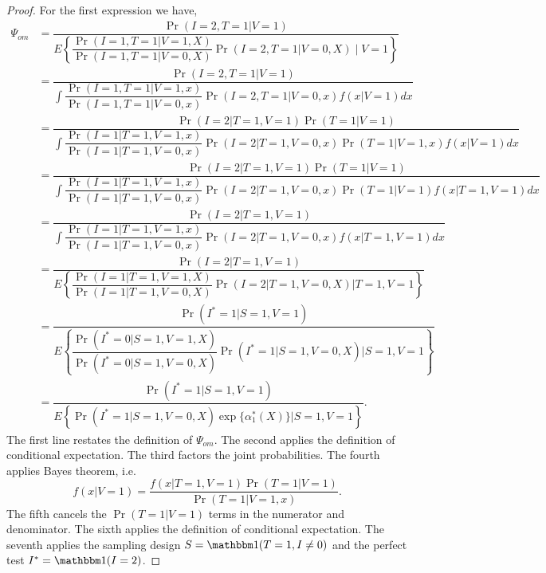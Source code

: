 \begin{appendix}
    \begin{proof}
    For the first expression we have,
        \begin{align*}
        \Psi_{om} &= \dfrac{\Pr(I=2, T = 1|V=1)}{E\left\{ \dfrac{\Pr(I = 1, T = 1 | V = 1, X)}{\Pr(I = 1, T = 1 | V = 0, X)}\Pr(I = 2, T = 1 | V = 0, X) \mid  V = 1\right\}} \\
        &= \dfrac{\Pr(I = 2, T = 1 | V = 1)}{\int \dfrac{\Pr(I = 1, T = 1 | V = 1, x)}{\Pr(I = 1, T = 1 | V = 0, x)} \Pr(I = 2, T = 1 | V = 0, x) f(x | V = 1) dx} \\
        &= \dfrac{\Pr(I = 2 | T = 1, V = 1)\Pr(T = 1 | V = 1)}{\int \dfrac{\Pr(I = 1 | T = 1, V = 1, x)}{\Pr(I = 1 | T = 1, V = 0, x)} \Pr(I = 2 | T = 1, V = 0, x) \Pr(T = 1 | V = 1, x) f(x | V = 1) dx} \\
        &= \dfrac{\Pr(I = 2 | T = 1, V = 1)\Pr(T = 1 | V = 1)}{\int \dfrac{\Pr(I = 1 | T = 1, V = 1, x)}{\Pr(I = 1 | T = 1, V = 0, x)} \Pr(I = 2 | T = 1, V = 0, x) \Pr(T = 1 | V = 1) f(x | T =1, V = 1) dx} \\
        &= \dfrac{\Pr(I = 2 | T = 1, V = 1)}{\int \dfrac{\Pr(I = 1 | T = 1, V = 1, x)}{\Pr(I = 1 | T = 1, V = 0, x)} \Pr(I = 2 | T = 1, V = 0, x) f(x | T =1, V = 1) dx} \\
        &= \dfrac{\Pr(I = 2 | T = 1, V = 1)}{E\left\{ \dfrac{\Pr(I = 1 | T = 1, V = 1, X)}{\Pr(I = 1 | T = 1, V = 0, X)} \Pr(I = 2 | T = 1, V = 0, X) \bigg| T = 1, V = 1\right\}} \\
        &= \dfrac{\Pr(I^* = 1 | S = 1, V = 1)}{E\left\{ \dfrac{\Pr(I^* = 0 | S = 1, V = 1, X)}{\Pr(I^* = 0 | S = 1, V = 0, X)} \Pr(I^* = 1 | S = 1, V = 0, X) \bigg| S = 1, V = 1\right\}} \\
        &= \dfrac{\Pr(I^* = 1 | S = 1, V = 1)}{E\left\{ \Pr(I^* = 1 | S = 1, V = 0, X) \exp\{\alpha^*_1(X)\}\Big| S = 1, V = 1 \right\}}.
    \end{align*}
    The first line restates the definition of $\Psi_{om}$. The second applies the definition of conditional expectation. The third factors the joint probabilities. The fourth applies Bayes theorem, i.e. 
    \begin{equation*}
        f(x | V = 1) = \dfrac{f(x | T = 1, V = 1)\Pr(T = 1 | V = 1)}{\Pr(T = 1 | V = 1, x)}.
    \end{equation*}
    The fifth cancels the $\Pr(T = 1 |V = 1)$ terms in the numerator and denominator. The sixth applies the definition of conditional expectation. The seventh applies the sampling design $S = \mathbbm 1 (T = 1, I \neq 0)$ and the perfect test $I^* = \mathbbm 1(I = 2)$.
    

\end{proof}
\end{appendix}
